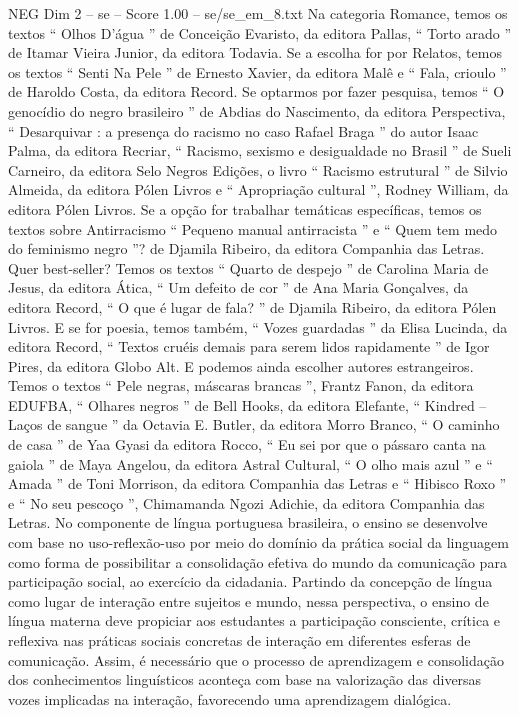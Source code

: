 \begin{textsample}{NEG Dim 2 – se – Score 1.00 – se/se\_em\_8.txt}
Na categoria Romance, temos os textos “ Olhos D’água ” de Conceição Evaristo, da editora Pallas, “ Torto arado ” de Itamar Vieira Junior, da editora Todavia.
Se a escolha for por Relatos, temos os textos “ Senti Na Pele ” de Ernesto Xavier, da editora Malê e “ Fala, crioulo ” de Haroldo Costa, da editora Record.
Se optarmos por fazer pesquisa, temos “ O genocídio do negro brasileiro ” de Abdias do Nascimento, da editora Perspectiva, “ Desarquivar : a presença do racismo no caso Rafael Braga ” do autor Isaac Palma, da editora Recriar, “ Racismo, sexismo e desigualdade no Brasil ” de Sueli Carneiro, da editora Selo Negros Edições, o livro “ Racismo estrutural ” de Silvio Almeida, da editora Pólen Livros e “ Apropriação cultural ”, Rodney William, da editora Pólen Livros.
Se a opção for trabalhar temáticas específicas, temos os textos sobre Antirracismo “ Pequeno manual antirracista ” e “ Quem tem medo do feminismo negro ”? de Djamila Ribeiro, da editora Companhia das Letras.
Quer best-seller?
Temos os textos “ Quarto de despejo ” de Carolina Maria de Jesus, da editora Ática, “ Um defeito de cor ” de Ana Maria Gonçalves, da editora Record, “ O que é lugar de fala? ” de Djamila Ribeiro, da editora Pólen Livros.
E se for poesia, temos também, “ Vozes guardadas ” da Elisa Lucinda, da editora Record, “ Textos cruéis demais para serem lidos rapidamente ” de Igor Pires, da editora Globo Alt.
E podemos ainda escolher autores estrangeiros.
Temos o textos “ Pele negras, máscaras brancas ”, Frantz Fanon, da editora EDUFBA, “ Olhares negros ” de Bell Hooks, da editora Elefante, “ Kindred – Laços de sangue ” da Octavia E.
Butler, da editora Morro Branco, “ O caminho de casa ” de Yaa Gyasi da editora Rocco, “ Eu sei por que o pássaro canta na gaiola ” de Maya Angelou, da editora Astral Cultural, “ O olho mais azul ” e “ Amada ” de Toni Morrison, da editora Companhia das Letras e “ Hibisco Roxo ” e “ No seu pescoço ”, Chimamanda Ngozi Adichie, da editora Companhia das Letras.
No componente de língua portuguesa brasileira, o ensino se desenvolve com base no uso-reflexão-uso por meio do domínio da prática social da linguagem como forma de possibilitar a consolidação efetiva do mundo da comunicação para participação social, ao exercício da cidadania.
Partindo da concepção de língua como lugar de interação entre sujeitos e mundo, nessa perspectiva, o ensino de língua materna deve propiciar aos estudantes a participação consciente, crítica e reflexiva nas práticas sociais concretas de interação em diferentes esferas de comunicação.
Assim, é necessário que o processo de aprendizagem e consolidação dos conhecimentos linguísticos aconteça com base na valorização das diversas vozes implicadas na interação, favorecendo uma aprendizagem dialógica.

\end{textsample}
